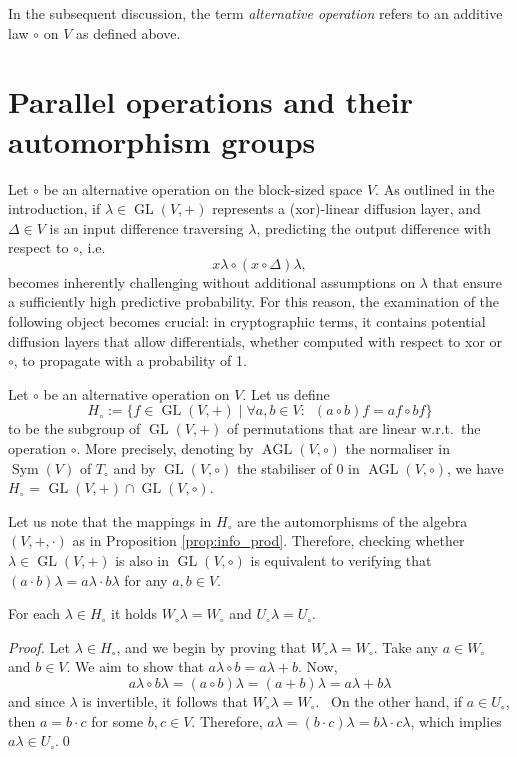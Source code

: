 \documentclass[runningheads,a4paper,english]{llncs}
\newcommand{\lb}{\lambda}
\DeclareMathOperator{\GL}{GL}
\DeclareMathOperator{\AGL}{AGL}
\DeclareMathOperator{\sym}{Sym}
\newcommand{\Wo}{W_\circ}
\newcommand{\Uo}{U_\circ}
\newcommand{\uo}{U_\circ}
\newcommand{\Ho}{H_\circ}
\begin{document}
In the subsequent discussion, the term \emph{alternative operation} refers to an additive law $\circ$ on $V$ as defined above.

\section{Parallel operations and their automorphism groups}
\label{sec:aut}

Let $\circ$ be an alternative operation on the block-sized space $V$.  As outlined in the introduction, if $\lambda \in \GL(V,+)$ represents a (xor)-linear diffusion layer, and $\Delta \in V$ is an input difference traversing $\lambda$, predicting the output difference with respect to $\circ$, i.e.
\[
x\lambda \circ (x \circ \Delta)\lambda,
\]
becomes inherently challenging without additional assumptions on $\lambda$ that ensure a sufficiently high predictive probability.
For this reason, the examination of the following object becomes crucial: in cryptographic terms, it contains potential diffusion layers that allow differentials, whether computed with respect to xor or $\circ$, to propagate with a probability of 1.
\begin{definition}
Let $\circ$ be an alternative operation on $V$. Let us define 
\[
H_\circ := \{f \in \GL(V,+) \mid  \forall a,b \in V: \,\,\,(a\circ b)f=af\circ bf\}
\]
to be the subgroup of $\GL(V,+)$ of permutations that are linear w.r.t.\ the operation $\circ$. More precisely, denoting by $\AGL(V,\circ)$ the normaliser in $\sym(V)$ of $T_\circ$ and by $\GL(V,\circ)$ the stabiliser of $0$ in $\AGL(V,\circ)$, we have $H_\circ$ = $\GL(V,+)\cap \GL(V,\circ)$.
\end{definition}

\begin{remark}
Let us note that the mappings in $H_\circ$ are the automorphisms of the algebra $(V,+,\cdot)$ as in Proposition \ref{prop:info_prod}. Therefore, checking whether $\lambda\in\GL(V,+)$ is also in $\GL(V,\circ)$ is equivalent to verifying that $(a\cdot b) \lambda=a\lambda\cdot b\lambda$ for any $a,b\in V$.
\end{remark}


\begin{lemma}
	\label{lem:spazi_fissi}
	For each $\lb \in \Ho$ it holds $\Wo\lb = \Wo$ and $\Uo\lb = \Uo$.
\end{lemma}
\begin{proof}
	Let $\lambda \in \Ho$, and we begin by proving that $\Wo\lambda = \Wo$. Take any $a \in \Wo$ and $b \in V$. We aim to show that $a\lambda \circ b = a\lambda + b$. Now,
$$ a\lambda \circ b\lambda = (a \circ b)\lambda = (a + b)\lambda = a\lambda + b\lambda $$
and since $\lambda$ is invertible, it follows that $\Wo\lambda = \Wo$. \
On the other hand, if $a \in \uo$, then $a = b \cdot c$ for some $b, c \in V$. Therefore, $a\lambda = (b \cdot c)\lambda = b\lambda \cdot c\lambda$, which implies $a\lambda \in \uo$.\qed
\end{proof}
\end{document}

